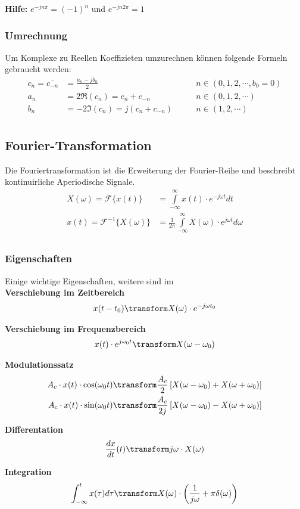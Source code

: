 \noindent\textbf{Hilfe:} $e^{-jn\pi} = (-1)^n$ und $e^{-jn2\pi} = 1$

\subsubsection{Umrechnung}\label{umrechnung}
Um Komplexe zu Reellen Koeffizieten umzurechnen können folgende Formeln gebraucht werden:
\begin{align*}
	c_n = \overline{c_{-n}} &= \frac{a_n - jb_n}{2} &\qquad n \in (0,1,2, \cdots, b_0 = 0) \\
	a_n &= 2\Re(c_n) = c_n + c_{-n}  &\qquad n \in (0,1,2, \cdots) \\
	b_n &= -2\Im(c_n) = j(c_n + c_{-n}) &\qquad n \in (1,2, \cdots) \\
\end{align*}



\subsection{Fourier-Transformation}
Die Fouriertransformation ist die Erweiterung der Fourier-Reihe und beschreibt kontinuirliche Aperiodische Signale.
\begin{align*}
	X(\omega) = \mathcal{F}\{x(t)\} &= \int\limits_{-\infty}^{\infty}x(t)\cdot e^{-j\omega t}dt \\
	x(t) = \mathcal{F}^{-1}\{X(\omega)\} &= \frac{1}{2\pi}\int\limits_{-\infty}^{\infty}X(\omega)\cdot e^{j\omega t}d\omega \\
\end{align*}

\subsubsection{Eigenschaften}
Einige wichtige Eigenschaften, weitere sind im \\
\noindent\textbf{Verschiebung im Zeitbereich}
\begin{align*}
	x(t - t_0) \transform X(\omega) \cdot e^{-j\omega t_0} 
\end{align*}

\noindent\textbf{Verschiebung im Frequenzbereich}
\begin{align*}
	x(t) \cdot e^{j\omega_0 t} \transform X(\omega - \omega_0)
\end{align*}

\noindent\textbf{Modulationssatz}
\begin{align*}
	A_c \cdot x(t) \cdot \cos(\omega_0t) &\transform \frac{A_c}{2}\left[X(\omega - \omega_0) + X(\omega + \omega_0)\right] \\
	A_c \cdot x(t) \cdot \sin(\omega_0t) &\transform \frac{A_c}{2j}\left[X(\omega - \omega_0) - X(\omega + \omega_0)\right]
\end{align*}

\noindent\textbf{Differentation}
\begin{align*}
	\frac{dx}{dt}(t) \transform j\omega \cdot X(\omega)
\end{align*}

\noindent\textbf{Integration}
\begin{align*}
	\int_{-\infty}^{t}x(\tau)d\tau \transform X(\omega)\cdot \left(\frac{1}{j\omega} + \pi \delta(\omega)\right)
\end{align*}
